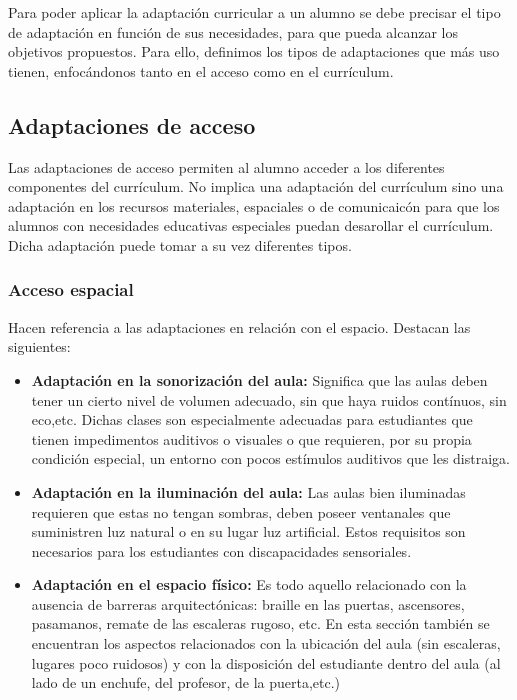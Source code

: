 Para poder aplicar la adaptación curricular a un alumno se debe precisar el tipo de adaptación en función de sus necesidades, para que pueda alcanzar los objetivos propuestos. Para ello, definimos los tipos de adaptaciones que más uso tienen, enfocándonos tanto en el acceso como en el currículum. 

\subsection{Adaptaciones de acceso}
Las adaptaciones de acceso permiten al alumno acceder a los diferentes componentes del currículum. No implica una adaptación del currículum sino una adaptación en los recursos materiales, espaciales o de comunicaicón para que los alumnos con necesidades educativas especiales puedan desarollar el currículum. 
Dicha adaptación puede tomar a su vez diferentes tipos.

\subsubsection{Acceso espacial}
Hacen referencia a las adaptaciones en relación con el espacio. Destacan las siguientes:
\begin{itemize}
    \item \textbf{Adaptación en la sonorización del aula:} Significa que las aulas deben tener un cierto nivel de volumen adecuado, sin que haya ruidos contínuos, sin eco,etc. Dichas clases son especialmente adecuadas para estudiantes que tienen impedimentos auditivos o visuales o que requieren, por su propia condición especial, un entorno con pocos estímulos auditivos que les distraiga.
    \item \textbf{Adaptación en la iluminación del aula:} Las aulas bien iluminadas requieren que estas no tengan sombras, deben poseer ventanales que suministren luz natural o en su lugar luz artificial. Estos requisitos son necesarios para los estudiantes con discapacidades sensoriales.
    \item \textbf{Adaptación en el espacio físico:} Es todo aquello relacionado con la ausencia de barreras arquitectónicas:  braille en las puertas, ascensores, pasamanos, remate de las escaleras rugoso, etc. En esta sección también se encuentran los aspectos relacionados con la ubicación del aula (sin escaleras, lugares poco ruidosos) y con la disposición del estudiante dentro del aula (al lado de un enchufe, del profesor, de la puerta,etc.)
\end{itemize}

